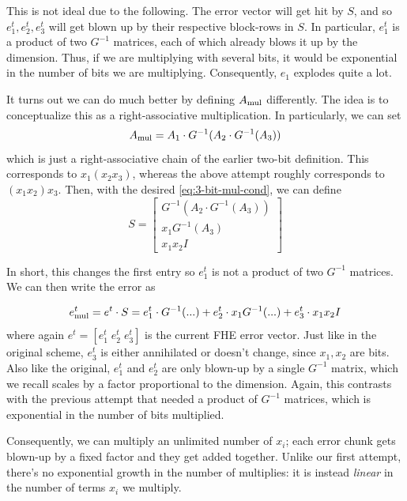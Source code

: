 \documentclass[11pt]{article}
\begin{document}
\noindent This is not ideal due to the following. The error vector will get hit by $S$, and so $e_1^t,e_2^t,e_3^t$ will get blown up by their respective block-rows in $S$. In particular, $e_1^t$ is a product of two $G^{-1}$ matrices, each of which already blows it up by the dimension. Thus, if we are multiplying with several bits, it would be exponential in the number of bits we are multiplying. Consequently, $e_1$ explodes quite a lot.

It turns out we can do much better by defining $A_{\textmd{mul}}$ differently. The idea is to conceptualize this as a right-associative multiplication. In particularly, we can set
\begin{equation}
    \label{eq:3-bit-mul-amul}
    A_{\textmd{mul}} = A_1 \cdot G^{-1}(A_2 \cdot G^{-1}(A_3))
\end{equation}
\noindent which is just a right-associative chain of the earlier two-bit definition. This corresponds to $x_1(x_2x_3)$, whereas the above attempt roughly corresponds to $(x_1x_2)x_3$. Then, with the desired \cref{eq:3-bit-mul-cond}, we can define
\begin{equation}
    \label{3-bit-mul-s}
    S = \begin{bmatrix}
        G^{-1}\left(A_2 \cdot G^{-1}(A_3)\right) \\
        x_1G^{-1}(A_3) \\
        x_1x_2I
    \end{bmatrix}
\end{equation}


\noindent In short, this changes the first entry so $e_1^t$ is not a product of two $G^{-1}$ matrices. We can then write the error as

\begin{equation}
    \label{eq:3-bit-mul-err}
    e_{\textmd{mul}}^t = e^t \cdot S = e_1^t \cdot G^{-1}(...) + e_2^t \cdot x_1G^{-1}(...) + e_3^t \cdot x_1x_2I
\end{equation}
\noindent where again $e^t = [e_1^t \; e_2^t \; e_3^t]$ is the current FHE error vector. Just like in the original scheme, $e_3^t$ is either annihilated or doesn't change, since $x_1,x_2$ are bits. Also like the original, $e_1^t$ and $e_2^t$ are only blown-up by a single $G^{-1}$ matrix, which we recall scales by a factor proportional to the dimension. Again, this contrasts with the previous attempt that needed a product of $G^{-1}$ matrices, which is exponential in the number of bits multiplied.

Consequently, we can multiply an unlimited number of $x_i$; each error chunk gets blown-up by a fixed factor and they get added together. Unlike our first attempt, there's no exponential growth in the number of multiplies: it is instead \emph{linear} in the number of terms $x_i$ we multiply.
\end{document}
